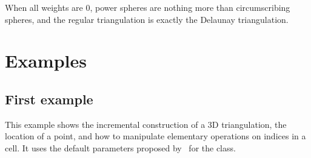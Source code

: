 When all weights are 0, power spheres are nothing more than
circumscribing spheres, and the regular triangulation is exactly the
Delaunay triangulation.













\section{Examples}
\label{Triangulation3-sec-examples}
\subsection{First example}
This example shows the incremental construction of a 3D triangulation, 
the location of a point, and how to manipulate elementary operations
on indices in a cell. It uses the default parameters proposed by
\cgal\ for the  class.

